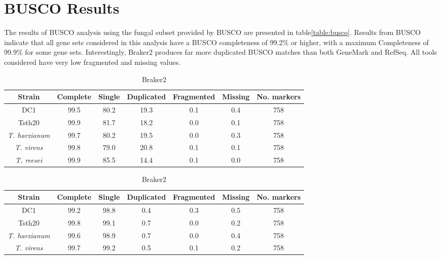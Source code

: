 \section{BUSCO Results}

The results of BUSCO analysis using the fungal subset provided by
BUSCO are presented in table\ref{table:busco}. Results from BUSCO
indicate that all gene sets considered in this analysis have a BUSCO
completeness of 99.2\% or higher, with a maximum Completeness of
99.9\% for some gene sets. Interestingly, Braker2 produces far more
duplicated BUSCO matches than both GeneMark and RefSeq. All tools
considered have very low fragmented and missing values.

\begin{table}
  \begin{center}
    \begin{subtable}{\textwidth}
      \centering
      \begin{tabular}{|c|c|c|c|c|c|c|}
        \hline
        Strain & Complete & Single & Duplicated & Fragmented & Missing & No. markers \\ \hline
        DC1 & 99.5 & 80.2 & 19.3 & 0.1 & 0.4 & 758 \\ \hline
        Tsth20 & 99.9 & 81.7 & 18.2 & 0.0 & 0.1 & 758 \\ \hline
        \textit{T. harzianum} & 99.7 & 80.2 & 19.5 & 0.0 & 0.3 & 758 \\ \hline
        \textit{T. virens} & 99.8 & 79.0 & 20.8 & 0.1 & 0.1 & 758 \\ \hline
        \textit{T. reesei} & 99.9 & 85.5 & 14.4 & 0.1 & 0.0 & 758 \\ \hline
      \end{tabular}
      \caption{Braker2}
    \end{subtable}
    \begin{subtable}{\textwidth}
      \centering
      \begin{tabular}{|c|c|c|c|c|c|c|}
        \hline
        Strain & Complete & Single & Duplicated & Fragmented & Missing & No. markers \\ \hline
        DC1 & 99.2 & 98.8 & 0.4 & 0.3 & 0.5 & 758 \\ \hline
        Tsth20 & 99.8 & 99.1 & 0.7 & 0.0 & 0.2 & 758 \\ \hline
        \textit{T. harzianum} & 99.6 & 98.9 & 0.7 & 0.0 & 0.4 & 758 \\ \hline
        \textit{T. virens} & 99.7 & 99.2 & 0.5 & 0.1 & 0.2 & 758 \\ \hline

\end{tabular}
\end{subtable}
\end{center}
\end{table}
